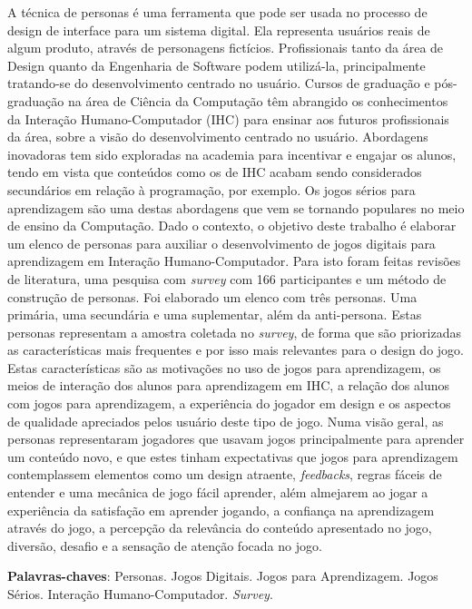\begin{resumo}

A técnica de personas é uma ferramenta que pode ser usada no processo de design de interface para um sistema digital. Ela representa usuários reais de algum produto, através de personagens fictícios. Profissionais tanto da área de Design quanto da Engenharia de Software podem utilizá-la, principalmente tratando-se do desenvolvimento centrado no usuário. Cursos de graduação e pós-graduação na área de Ciência da Computação têm abrangido os conhecimentos da Interação Humano-Computador (IHC) para ensinar aos futuros profissionais da área, sobre a visão do desenvolvimento centrado no usuário. Abordagens inovadoras tem sido exploradas na academia para incentivar e engajar os alunos, tendo em vista que conteúdos como os de IHC acabam sendo considerados secundários em relação à programação, por exemplo. Os jogos sérios para aprendizagem são uma destas abordagens que vem se tornando populares no meio de ensino da Computação. Dado o contexto, o objetivo deste trabalho é elaborar um elenco de personas para auxiliar o desenvolvimento de jogos digitais para aprendizagem em Interação Humano-Computador. Para isto foram feitas revisões de literatura, uma pesquisa com \textit{survey} com 166 participantes e um método de construção de personas. Foi elaborado um elenco com três personas. Uma primária, uma secundária e uma suplementar, além da anti-persona. Estas personas representam a amostra coletada no \textit{survey}, de forma que são priorizadas as características mais frequentes e por isso mais relevantes para o design do jogo. Estas características são as motivações no uso de jogos para aprendizagem, os meios de interação dos alunos para aprendizagem em IHC, a relação dos alunos com jogos para aprendizagem, a experiência do jogador em design e os aspectos de qualidade apreciados pelos usuário deste tipo de jogo. Numa visão geral, as personas representaram jogadores que usavam jogos principalmente para aprender um conteúdo novo, e que estes tinham expectativas que jogos para aprendizagem contemplassem elementos como um design atraente, \textit{feedbacks}, regras fáceis de entender e uma mecânica de jogo fácil aprender, além almejarem ao jogar a experiência da satisfação em aprender jogando, a confiança na aprendizagem através do jogo, a percepção da relevância do conteúdo apresentado no jogo, diversão, desafio e a sensação de atenção focada no jogo.


\vspace{\onelineskip}
    
\noindent
\textbf{Palavras-chaves}: Personas. Jogos Digitais. Jogos para Aprendizagem. Jogos Sérios. Interação Humano-Computador. \textit{Survey}.
\end{resumo}
